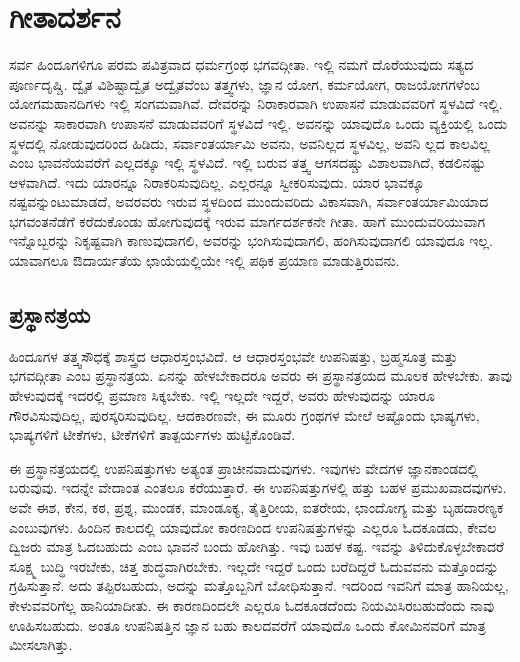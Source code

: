 
\chapter*{ಗೀತಾದರ್ಶನ}

ಸರ್ವ ಹಿಂದೂಗಳಿಗೂ ಪರಮ ಪವಿತ್ರವಾದ ಧರ್ಮಗ್ರಂಥ ಭಗವದ್ಗೀತಾ. ಇಲ್ಲಿ ನಮಗೆ ದೊರೆಯುವುದು ಸತ್ಯದ ಪೂರ್ಣದೃಷ್ಚಿ. ದ್ವೈತ ವಿಶಿಷ್ಟಾದ್ವೈತ ಅದ್ವೈತವೆಂಬ ತತ್ತ್ವಗಳು, ಜ್ಞಾನ ಯೋಗ, ಕರ್ಮಯೋಗ, ರಾಜಯೋಗಗಳೆಂಬ ಯೋಗಮಹಾನದಿಗಳು ಇಲ್ಲಿ ಸಂಗಮವಾಗಿವೆ. ದೇವರನ್ನು ನಿರಾಕಾರವಾಗಿ ಉಪಾಸನೆ ಮಾಡುವವರಿಗೆ ಸ್ಥಳವಿದೆ ಇಲ್ಲಿ. ಅವನನ್ನು ಸಾಕಾರವಾಗಿ ಉಪಾಸನೆ ಮಾಡುವವರಿಗೆ ಸ್ಥಳವಿದೆ ಇಲ್ಲಿ. ಅವನನ್ನು ಯಾವುದೊ ಒಂದು ವ್ಯಕ್ತಿಯಲ್ಲಿ ಒಂದು ಸ್ಥಳದಲ್ಲಿ ನೋಡುವುದರಿಂದ ಹಿಡಿದು, ಸರ್ವಾಂತರ್ಯಾಮಿ ಅವನು, ಅವನಿಲ್ಲದ ಸ್ಥಳವಿಲ್ಲ, ಅವನಿ ಲ್ಲದ ಕಾಲವಿಲ್ಲ ಎಂಬ ಭಾವನೆಯವರೆಗೆ ಎಲ್ಲದಕ್ಕೂ ಇಲ್ಲಿ ಸ್ಥಳವಿದೆ. ಇಲ್ಲಿ ಬರುವ ತತ್ತ್ವ ಆಗಸದಷ್ಚು ವಿಶಾಲವಾಗಿದೆ, ಕಡಲಿನಷ್ಟು ಆಳವಾಗಿದೆ. ಇದು ಯಾರನ್ನೂ ನಿರಾಕರಿಸುವುದಿಲ್ಲ. ಎಲ್ಲರನ್ನೂ ಸ್ವೀಕರಿಸುವುದು. ಯಾರ ಭಾವಕ್ಕೂ ನಷ್ಟವನ್ನುಂಟುಮಾಡದೆ, ಅವರವರು ಇರುವ ಸ್ಥಳದಿಂದ ಮುಂದುವರಿದು ವಿಕಾಸವಾಗಿ, ಸರ್ವಾಂತರ್ಯಾಮಿಯಾದ ಭಗವಂತನೆಡೆಗೆ ಕರೆದುಕೊಂಡು ಹೋಗುವುದಕ್ಕೆ ಇರುವ ಮಾರ್ಗದರ್ಶಕನೇ ಗೀತಾ. ಹಾಗೆ ಮುಂದುವರಿಯುವಾಗ ಇನ್ನೊಬ್ಬರನ್ನು ನಿಕೃಷ್ಟವಾಗಿ ಕಾಣುವುದಾಗಲಿ, ಅವರನ್ನು ಭಂಗಿಸುವುದಾಗಲಿ, ಹಂಗಿಸುವುದಾಗಲಿ ಯಾವುದೂ ಇಲ್ಲ. ಯಾವಾಗಲೂ ಔದಾರ್ಯತೆಯ ಛಾಯೆಯಲ್ಲಿಯೇ ಇಲ್ಲಿ ಪಥಿಕ ಪ್ರಯಾಣ ಮಾಡುತ್ತಿರುವನು.

\section*{ಪ್ರಸ್ಥಾನತ್ರಯ}

ಹಿಂದೂಗಳ ತತ್ತ್ವಸೌಧಕ್ಕೆ ಶಾಸ್ತ್ರದ ಆಧಾರಸ್ತಂಭವಿದೆ. ಆ ಆಧಾರಸ್ತಂಭವೇ ಉಪನಿಷತ್ತು, ಬ್ರಹ್ಮಸೂತ್ರ ಮತ್ತು ಭಗವದ್ಗೀತಾ ಎಂಬ ಪ್ರಸ್ಥಾನತ್ರಯ. ಏನನ್ನು ಹೇಳಬೇಕಾದರೂ ಅವರು ಈ ಪ್ರಸ್ಥಾನತ್ರಯದ ಮೂಲಕ ಹೇಳಬೇಕು. ತಾವು ಹೇಳುವುದಕ್ಕೆ ಇದರಲ್ಲಿ ಪ್ರಮಾಣ ಸಿಕ್ಕಬೇಕು. ಇಲ್ಲಿ ಇಲ್ಲದೇ ಇದ್ದರೆ, ಅವರು ಹೇಳುವುದನ್ನು ಯಾರೂ ಗೌರವಿಸುವುದಿಲ್ಲ, ಪುರಸ್ಕರಿಸುವುದಿಲ್ಲ. ಆದಕಾರಣವೇ, ಈ ಮೂರು ಗ್ರಂಥಗಳ ಮೇಲೆ ಅಷ್ಟೊಂದು ಭಾಷ್ಯಗಳು, ಭಾಷ್ಯಗಳಿಗೆ ಟೀಕೆಗಳು, ಟೀಕೆಗಳಿಗೆ ತಾತ್ಪರ್ಯಗಳು ಹುಟ್ಟಿಕೊಂಡಿವೆ.

ಈ ಪ್ರಸ್ಥಾನತ್ರಯದಲ್ಲಿ ಉಪನಿಷತ್ತುಗಳು ಅತ್ಯಂತ ಪ್ರಾಚೀನವಾದುವುಗಳು. ಇವುಗಳು ವೇದಗಳ ಜ್ಞಾನಕಾಂಡದಲ್ಲಿ ಬರುವುವು. ಇದನ್ನೇ ವೇದಾಂತ ಎಂತಲೂ ಕರೆಯುತ್ತಾರೆ. ಈ ಉಪನಿಷತ್ತುಗಳಲ್ಲಿ ಹತ್ತು ಬಹಳ ಪ್ರಮುಖವಾದವುಗಳು. ಅವೇ ಈಶ, ಕೇನ, ಕಠ, ಪ್ರಶ್ನ, ಮುಂಡಕ, ಮಾಂಡೂಕ್ಯ, ತೈತ್ತಿರೀಯ, ಐತರೇಯ, ಛಾಂದೋಗ್ಯ ಮತ್ತು ಬೃಹದಾರಣ್ಯಕ ಎಂಬುವುಗಳು. ಹಿಂದಿನ ಕಾಲದಲ್ಲಿ ಯಾವುದೋ ಕಾರಣದಿಂದ ಉಪನಿಷತ್ತುಗಳನ್ನು ಎಲ್ಲರೂ ಓದಕೂಡದು, ಕೇವಲ ದ್ವಿಜರು ಮಾತ್ರ ಓದಬಹುದು ಎಂಬ ಭಾವನೆ ಬಂದು ಹೋಗಿತ್ತು. ಇವು ಬಹಳ ಕಷ್ಟ. ಇವನ್ನು ತಿಳಿದುಕೊಳ್ಳಬೇಕಾದರೆ ಸೂಕ್ಷ್ಮ ಬುದ್ಧಿ ಇರಬೇಕು, ಚಿತ್ತ ಶುದ್ಧವಾಗಿರಬೇಕು. ಇಲ್ಲದೇ ಇದ್ದರೆ ಒಂದು ಬರೆದಿದ್ದರೆ ಓದುವವನು ಮತ್ತೊಂದನ್ನು ಗ್ರಹಿಸುತ್ತಾನೆ. ಅದು ತಪ್ಪಿರಬಹುದು, ಅದನ್ನು ಮತ್ತೊಬ್ಬನಿಗೆ ಬೋಧಿಸುತ್ತಾನೆ. ಇದರಿಂದ ಇವನಿಗೆ ಮಾತ್ರ ಹಾನಿಯಲ್ಲ, ಕೇಳುವವರಿಗೆಲ್ಲ ಹಾನಿಯಾದೀತು. ಈ ಕಾರಣದಿಂದಲೇ ಎಲ್ಲರೂ ಓದಕೂಡದೆಂದು ನಿಯಮಿಸಿರಬಹುದೆಂದು ನಾವು ಊಹಿಸಬಹುದು. ಅಂತೂ ಉಪನಿಷತ್ತಿನ ಜ್ಞಾನ ಬಹು ಕಾಲದವರೆಗೆ ಯಾವುದೊ ಒಂದು ಕೋಮಿನವರಿಗೆ ಮಾತ್ರ ಮೀಸಲಾಗಿತ್ತು.

